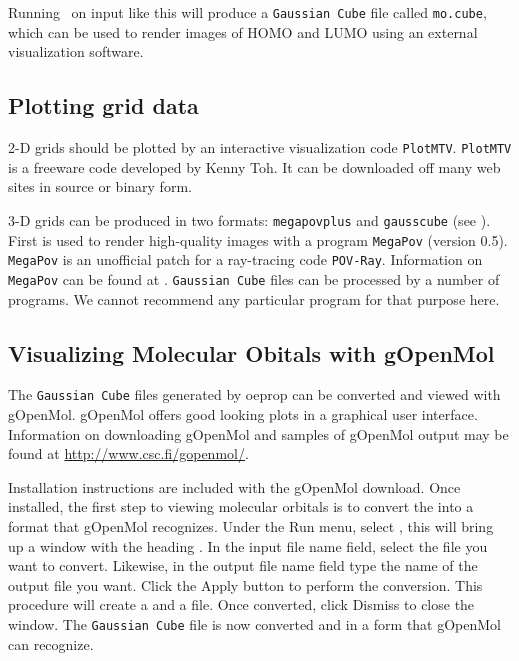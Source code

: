Running \PSIthree\ on input like this will produce a {\tt Gaussian Cube}
file called {\tt mo.cube}, which can be used to render images of HOMO
and LUMO using
an external visualization software.

\subsection{Plotting grid data}
2-D grids should be plotted by an interactive visualization
code {\tt PlotMTV}. {\tt PlotMTV} is a freeware code
developed by Kenny Toh. It can be downloaded off many web sites in
source or binary form.

3-D grids can be produced in two formats: {\tt megapovplus}  and {\tt gausscube}
(see ).
First is used to render high-quality images with a program {\tt MegaPov} (version
0.5).  {\tt MegaPov} is an unofficial patch for a ray-tracing code
{\tt POV-Ray}. Information on {\tt MegaPov} can be found at
.
{\tt Gaussian Cube} files can be processed by a number of programs. We cannot recommend
any particular program for that purpose here.

\subsection{Visualizing Molecular Obitals with gOpenMol}
The {\tt Gaussian Cube} files generated by oeprop can be converted and viewed with gOpenMol. 
gOpenMol offers good looking plots in a graphical user interface. Information on 
downloading gOpenMol and samples of gOpenMol output may be found at 
\url{http://www.csc.fi/gopenmol/}.

Installation instructions are included with the gOpenMol download. Once installed, the first 
step to viewing molecular orbitals is to convert the  into a format that 
gOpenMol recognizes. Under the Run menu, select , 
this will bring up a window with the heading . In the 
input file name field, select the  file you want to convert. Likewise, in 
the output file name field type the name of the output file you want. Click the Apply button 
to perform the conversion. This procedure will create a  and a 
 file. Once converted, click Dismiss to close the window. The 
{\tt Gaussian Cube} file is now converted and in a form that gOpenMol can recognize.

